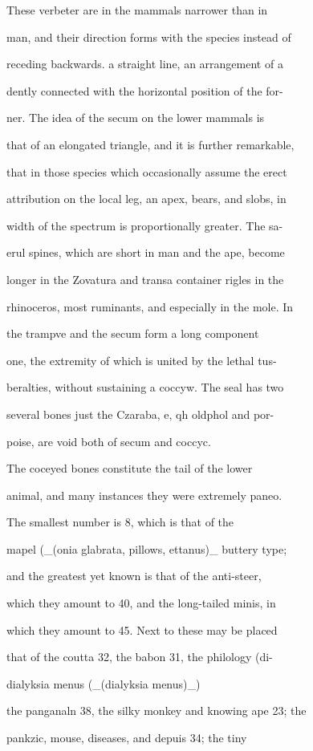 \documentclass{article}
\begin{document}
These verbeter are in the mammals narrower than in

man, and their direction forms with the species instead of

receding backwards. a straight line, an arrangement of a

dently connected with the horizontal position of the for-

ner. The idea of the secum on the lower mammals is

that of an elongated triangle, and it is further remarkable,

that in those species which occasionally assume the erect

attribution on the local leg, an apex, bears, and slobs, in

width of the spectrum is proportionally greater. The sa-

erul spines, which are short in man and the ape, become

longer in the Zovatura and transa container rigles in the

rhinoceros, most ruminants, and especially in the mole. In

the trampve and the secum form a long component

one, the extremity of which is united by the lethal tus-

beralties, without sustaining a coccyw. The seal has two

several bones just the Czaraba, e, qh oldphol and por-

poise, are void both of secum and coccyc.

The coceyed bones constitute the tail of the lower

animal, and many instances they were extremely paneo.

The smallest number is 8, which is that of the

mapel (\_(onia glabrata, pillows, ettanus)\_ buttery type;

and the greatest yet known is that of the anti-steer,

which they amount to 40, and the long-tailed minis, in

which they amount to 45. Next to these may be placed

that of the coutta 32, the babon 31, the philology (di-

dialyksia menus (\_(dialyksia menus)\_)

the panganaln 38, the silky monkey and knowing ape 23; the

pankzic, mouse, diseases, and depuis 34; the tiny
\end{document}
